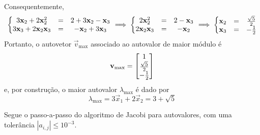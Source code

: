 \documentclass{homework}
\begin{document}
		Consequentemente,
			\begin{align*}\left\{\begin{array}{@{}ccc@{}}
			3 \vec{x}_2 + 2 \vec{x}_2^2 &=& 2 + 3 \vec{x}_2 - \vec{x}_3\\
			3 \vec{x}_3 + 2 \vec{x}_2 \vec{x}_3 &=& - \vec{x}_2 + 3 \vec{x}_3
			\end{array}\right. \implies \left\{\begin{array}{@{}ccc@{}}
			2 \vec{x}_2^2 &=& 2 - \vec{x}_3\\
			2 \vec{x}_2 \vec{x}_3 &=& - \vec{x}_2
			\end{array}\right. \implies \left\{\begin{array}{@{}ccc@{}}
			\vec{x}_2 &=& \frac{\sqrt{5}}{2}\\
			\vec{x}_3 &=& - \frac{1}{2}
			\end{array}\right.
			\end{align*}
		Portanto, o autovetor $\vec{v}_\text{max}$ associado ao autovalor de maior módulo é
		\begin{align*}
			\vec{v}_\text{max} = \left[\begin{array}{@{}c@{}}
			1 \\
			\frac{\sqrt{5}}{2} \\
			- \frac{1}{2}
			\end{array}\right]
		\end{align*}
		e, por construção, o maior autovalor $\lambda_\text{max}$ é dado por
			$$ \lambda_\text{max} = 3 \vec{x}_1 + 2 \vec{x}_2 = 3 + \sqrt{5} $$
			
		\subsubquest Segue o passo-a-passo do algoritmo de Jacobi para autovalores, com uma tolerância $|a_{i,j}| \le 10^{-3}$.
		
\end{document}
